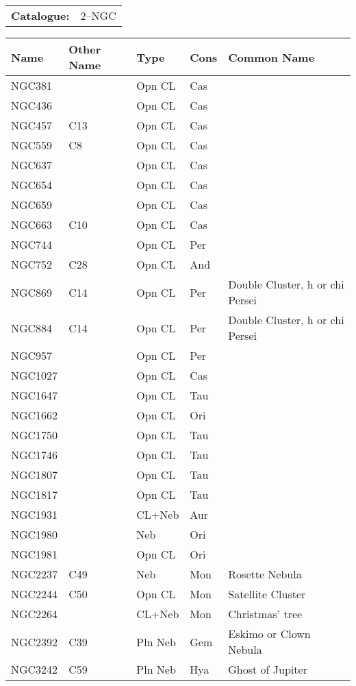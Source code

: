 \begin{tabular}{ p{0.9in} p{1.3in}}
{\bf Catalogue:} & 2--NGC \\ 
\end{tabular}
\begin{longtable}{ p{0.7in}  p{1.0in}  p{0.6in}  p{0.9in}  p{5.1in} }
\hline 
{\bf Name} & {\bf Other Name} & {\bf Type} & {\bf Cons} & {\bf Common Name} \\ 
\hline 
NGC381 &  & Opn CL & Cas &  \\ 
NGC436 &  & Opn CL & Cas &  \\ 
NGC457 & C13 & Opn CL & Cas &  \\ 
NGC559 & C8 & Opn CL & Cas &  \\ 
NGC637 &  & Opn CL & Cas &  \\ 
NGC654 &  & Opn CL & Cas &  \\ 
NGC659 &  & Opn CL & Cas &  \\ 
NGC663 & C10 & Opn CL & Cas &  \\ 
NGC744 &  & Opn CL & Per &  \\ 
NGC752 & C28 & Opn CL & And &  \\ 
NGC869 & C14 & Opn CL & Per & Double Cluster, h or chi Persei \\ 
NGC884 & C14 & Opn CL & Per & Double Cluster, h or chi Persei \\ 
NGC957 &  & Opn CL & Per &  \\ 
NGC1027 &  & Opn CL & Cas &  \\ 
NGC1647 &  & Opn CL & Tau &  \\ 
NGC1662 &  & Opn CL & Ori &  \\ 
NGC1750 &  & Opn CL & Tau &  \\ 
NGC1746 &  & Opn CL & Tau &  \\ 
NGC1807 &  & Opn CL & Tau &  \\ 
NGC1817 &  & Opn CL & Tau &  \\ 
NGC1931 &  & CL+Neb & Aur &  \\ 
NGC1980 &  & Neb & Ori &  \\ 
NGC1981 &  & Opn CL & Ori &  \\ 
NGC2237 & C49 & Neb & Mon & Rosette Nebula \\ 
NGC2244 & C50 & Opn CL & Mon & Satellite Cluster \\ 
NGC2264 &  & CL+Neb & Mon & Christmas' tree \\ 
NGC2392 & C39 & Pln Neb & Gem & Eskimo or Clown Nebula \\ 
NGC3242 & C59 & Pln Neb & Hya & Ghost of Jupiter \\ 

\end{longtable}
